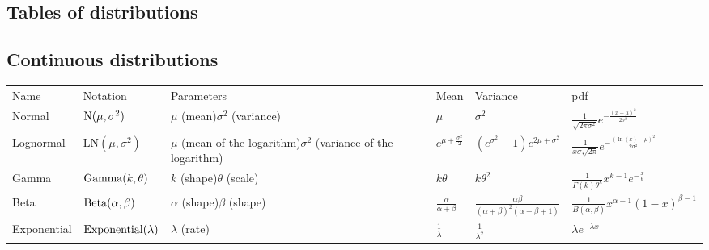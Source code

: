\documentclass[thesis.tex]{subfiles}
\begin{document}
\begin{landscape}
\chapter{Tables of distributions}
\section{Continuous distributions}
\begin{tabular}{llp{3.5cm}lll}
Name & Notation & Parameters & Mean & Variance & pdf\\
Normal & $\operatorname{N}(\mu, \sigma^2)$ & $\mu$ (mean)\newline $\sigma^2$ (variance) & $\mu$ & $\sigma^2$ & $\frac{1}{\sqrt{2\pi\sigma^2}}e^{-\frac{(x-\mu)^2}{2\sigma^2}}$ \\
Lognormal & $\text{LN}(\mu, \sigma^2)$ & $\mu$ (mean of the logarithm)\newline $\sigma^2$ (variance of the logarithm) & $e^{\mu + \frac{\sigma^2}{2}}$ & $(e^{\sigma^2} - 1)e^{2\mu + \sigma^2}$ & $\frac{1}{x\sigma\sqrt{2\pi}}e^{-\frac{(\ln(x)-\mu)^2}{2\sigma^2}}$ \\
Gamma & $\operatorname{Gamma}(k, \theta)$ & $k$ (shape)\newline $\theta$ (scale) & $k\theta$ & $k\theta^2$ & $\frac{1}{\Gamma(k)\theta^k}x^{k-1}e^{-\frac{x}{\theta}}$ \\
Beta & $\operatorname{Beta}(\alpha, \beta)$ & $\alpha$ (shape)\newline $\beta$ (shape) & $\frac{\alpha}{\alpha+\beta}$ & $\frac{\alpha\beta}{(\alpha+\beta)^2(\alpha+\beta+1)}$ & $\frac{1}{B(\alpha,\beta)}x^{\alpha-1}(1-x)^{\beta-1}$ \\
Exponential & $\operatorname{Exponential}(\lambda)$ & $\lambda$ (rate) & $\frac{1}{\lambda}$ & $\frac{1}{\lambda^2}$ & $\lambda e^{-\lambda x}$ \\
\end{tabular}


\end{landscape}
\end{document}
